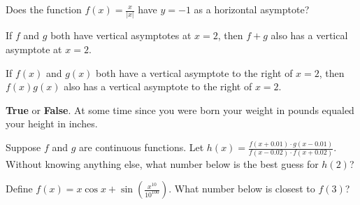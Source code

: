 \documentclass{ximera}
\newcommand{\recommendation}[1]{}
\newcommand{\GoodQuestions}[1]{}
\begin{document}
\begin{shuffle}
\begin{problem}
	Does the function $f(x) = \frac{x}{|x|}$ have $y=-1$ as a horizontal asymptote?
\end{problem}

\begin{problem}
	If $f$ and $g$ both have vertical asymptotes at $x=2$, then $f+g$ also has a vertical asymptote at $x=2$.
	\begin{multipleChoice}
	\end{multipleChoice}
\end{problem}

\begin{problem}
	If $f(x)$ and $g(x)$ both have a vertical asymptote to the right of $x=2$, then $f(x)g(x)$ also has a vertical asymptote to the right of $x=2$.
	\begin{multipleChoice}
		\choice[correct]{True}
		\choice{False}
	\end{multipleChoice}
\end{problem}



\begin{problem}
  \recommendation{Vic} \GoodQuestions{Subject: Continuity and the
    Intermediate Value Theorem 7P}
  \textbf{True} or \textbf{False}. At some time since you were born
  your weight in pounds equaled your height in inches.
\begin{multipleChoice}
\end{multipleChoice}
\end{problem}


\begin{problem}
  Suppose $f$ and $g$ are continuous functions.  Let $h(x) = \frac{f(x+0.01) \cdot g(x - 0.01)}{f(x-0.02) \cdot f(x + 0.02)}$.  Without knowing anything else, what number below is the best guess for $h(2)$?
  \begin{multipleChoice}
  \end{multipleChoice}
\end{problem}

\begin{problem}
  Define $f(x) = x \cos x + \sin\left(\frac{x^{10}}{10^{100}}\right)$.  What number below is closest to $f(3)$?
  \begin{multipleChoice}
  \end{multipleChoice}
\end{problem}


\end{shuffle}
\end{document}
